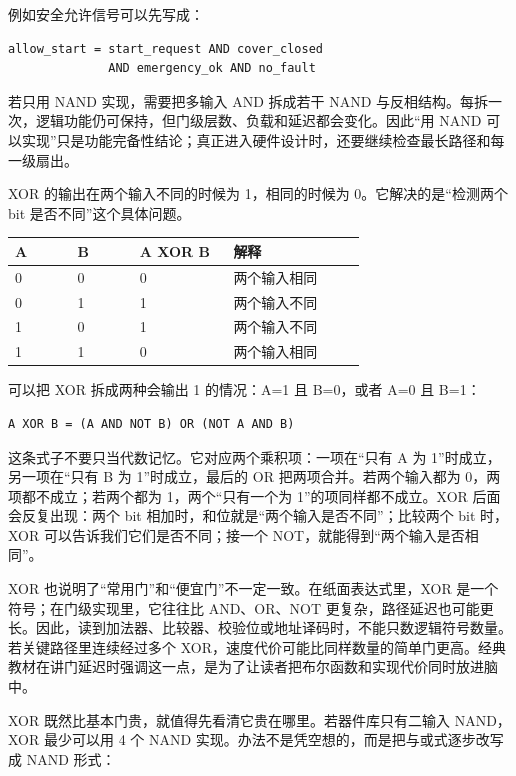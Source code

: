 例如安全允许信号可以先写成：

\begin{lstlisting}
allow_start = start_request AND cover_closed
              AND emergency_ok AND no_fault
\end{lstlisting}

若只用 NAND 实现，需要把多输入 AND 拆成若干 NAND 与反相结构。每拆一次，逻辑功能仍可保持，但门级层数、负载和延迟都会变化。因此“用 NAND 可以实现”只是功能完备性结论；真正进入硬件设计时，还要继续检查最长路径和每一级扇出。

XOR 的输出在两个输入不同的时候为 1，相同的时候为 0。它解决的是“检测两个 bit 是否不同”这个具体问题。

\begin{longtable}{L{0.16\linewidth}L{0.16\linewidth}L{0.24\linewidth}L{0.34\linewidth}}
\toprule
A & B & A XOR B & 解释 \\
 & 0 & 0 & 两个输入相同 \\
0 & 1 & 1 & 两个输入不同 \\
1 & 0 & 1 & 两个输入不同 \\
1 & 1 & 0 & 两个输入相同 \\
\bottomrule
\end{longtable}

可以把 XOR 拆成两种会输出 1 的情况：A=1 且 B=0，或者 A=0 且 B=1：

\begin{lstlisting}
A XOR B = (A AND NOT B) OR (NOT A AND B)
\end{lstlisting}

这条式子不要只当代数记忆。它对应两个乘积项：一项在“只有 A 为 1”时成立，另一项在“只有 B 为 1”时成立，最后的 OR 把两项合并。若两个输入都为 0，两项都不成立；若两个都为 1，两个“只有一个为 1”的项同样都不成立。XOR 后面会反复出现：两个 bit 相加时，和位就是“两个输入是否不同”；比较两个 bit 时，XOR 可以告诉我们它们是否不同；接一个 NOT，就能得到“两个输入是否相同”。

XOR 也说明了“常用门”和“便宜门”不一定一致。在纸面表达式里，XOR 是一个符号；在门级实现里，它往往比 AND、OR、NOT 更复杂，路径延迟也可能更长。因此，读到加法器、比较器、校验位或地址译码时，不能只数逻辑符号数量。若关键路径里连续经过多个 XOR，速度代价可能比同样数量的简单门更高。经典教材在讲门延迟时强调这一点，是为了让读者把布尔函数和实现代价同时放进脑中。

XOR 既然比基本门贵，就值得先看清它贵在哪里。若器件库只有二输入 NAND，XOR 最少可以用 4 个 NAND 实现。办法不是凭空想的，而是把与或式逐步改写成 NAND 形式：

